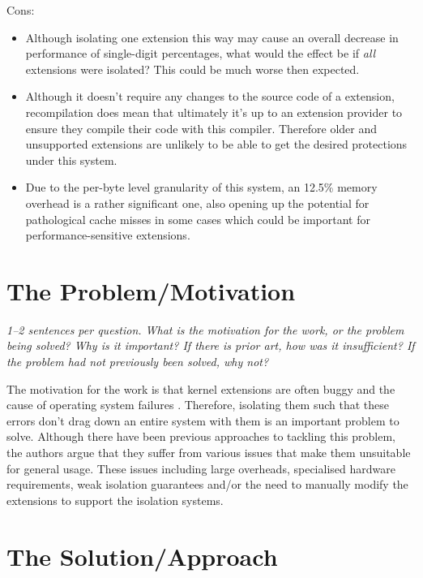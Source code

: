 \documentclass[11pt]{article}
\begin{document}
Cons:

\begin{itemize}

    \item Although isolating one extension this way may cause an overall
    decrease in performance of single-digit percentages, what would the effect
    be if \textit{all} extensions were isolated? This could be much worse then
    expected.

    \item Although it doesn't require any changes to the source code of a
    extension, recompilation does mean that ultimately it's up to an extension
    provider to ensure they compile their code with this compiler. Therefore
    older and unsupported extensions are unlikely to be able to get the desired
    protections under this system.

    \item Due to the per-byte level granularity of this system, an 12.5\%
    memory overhead is a rather significant one, also opening up the potential
    for pathological cache misses in some cases which could be important for
    performance-sensitive extensions.


\end{itemize}

\section*{The Problem/Motivation}

\textsl{1--2 sentences per question. What is the motivation for the work, or
the problem being solved? Why is it important? If there is prior art, how was
it insufficient? If the problem had not previously been solved, why not?}

The motivation for the work is that kernel extensions are often buggy and the
cause of operating system failures \cite{OSErrors}. Therefore, isolating them
such that these errors don't drag down an entire system with them is an
important problem to solve. Although there have been previous approaches to
tackling this problem, the authors argue that they suffer from various issues
that make them unsuitable for general usage. These issues including large
overheads, specialised hardware requirements, weak isolation guarantees and/or
the need to manually modify the extensions to support the isolation systems.

\section*{The Solution/Approach}
\end{document}
